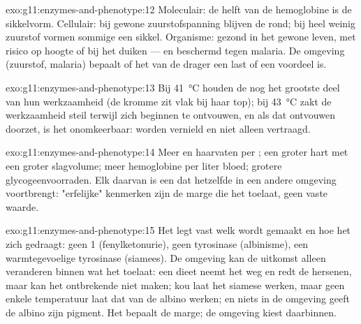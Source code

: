 \begin{solution}{exo:g11:enzymes-and-phenotype:12}
Moleculair: de helft van de hemoglobine is de sikkelvorm. Cellulair: bij
gewone zuurstofspanning blijven de  rond; bij heel weinig zuurstof
vormen sommige een sikkel. Organisme: gezond in het gewone leven, met
risico op hoogte of bij het duiken --- en beschermd tegen malaria. De
omgeving (zuurstof, malaria) bepaalt of het  van de drager een
last of een voordeel is.
\end{solution}

\begin{solution}{exo:g11:enzymes-and-phenotype:13}
Bij \qty{41}{\celsius} houden de  nog het grootste deel van hun
werkzaamheid (de kromme zit vlak bij haar top); bij \qty{43}{\celsius}
zakt de werkzaamheid steil terwijl  zich beginnen te ontvouwen,
en als dat ontvouwen doorzet, is het onomkeerbaar:  worden
vernield en niet alleen vertraagd.
\end{solution}

\begin{solution}{exo:g11:enzymes-and-phenotype:14}
Meer  en haarvaten per ; een groter hart met een
groter slagvolume; meer hemoglobine per liter bloed; grotere
glycogeenvoorraden. Elk daarvan is een  dat hetzelfde  in
een andere omgeving voortbrengt: "erfelijke" kenmerken zijn de marge die
het  toelaat, geen vaste waarde.
\end{solution}

\begin{solution}{exo:g11:enzymes-and-phenotype:15}
Het  legt vast welk  wordt gemaakt en hoe het zich gedraagt:
geen  1 (fenylketonurie), geen tyrosinase (albinisme), een
warmtegevoelige tyrosinase (siamees). De omgeving kan de uitkomst alleen
veranderen binnen wat het  toelaat: een dieet neemt het  weg
en redt de hersenen, maar kan het ontbrekende  niet maken; kou laat
het siamese  werken, maar geen enkele temperatuur laat dat van de
albino werken; en niets in de omgeving geeft de albino zijn pigment. Het
 bepaalt de marge; de omgeving kiest daarbinnen.
\end{solution}

